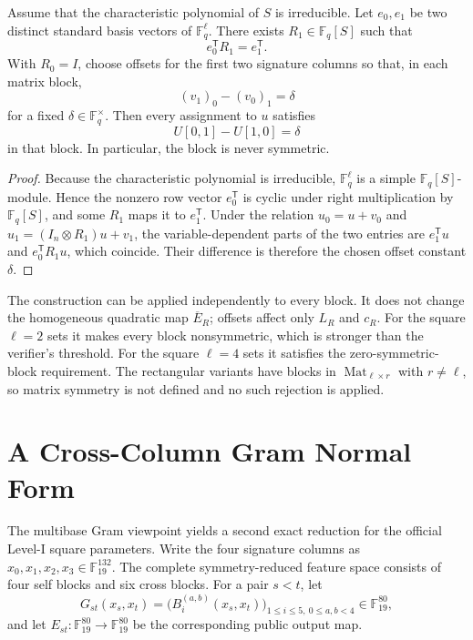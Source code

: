 \documentclass[runningheads]{llncs}
\newcommand{\F}{\mathbb F}
\newcommand{\Mat}{\operatorname{Mat}}
\newcommand{\transpose}{\mathsf T}
\begin{document}
\begin{lemma}\label{lem:skew}
Assume that the characteristic polynomial of $S$ is irreducible.  Let $e_0,e_1$ be two distinct standard basis vectors of $\F_q^\ell$.  There exists $R_1\in\F_q[S]$ such that
\[
 e_0^\transpose R_1=e_1^\transpose.
\]
With $R_0=I$, choose offsets for the first two signature columns so that, in each matrix block,
\[
 (v_1)_0-(v_0)_1=\delta
\]
for a fixed $\delta\in\F_q^\times$.  Then every assignment to $u$ satisfies
\[
 U[0,1]-U[1,0]=\delta
\]
in that block.  In particular, the block is never symmetric.
\end{lemma}

\begin{proof}
Because the characteristic polynomial is irreducible, $\F_q^\ell$ is a simple $\F_q[S]$-module.  Hence the nonzero row vector $e_0^\transpose$ is cyclic under right multiplication by $\F_q[S]$, and some $R_1$ maps it to $e_1^\transpose$.  Under the relation $u_0=u+v_0$ and $u_1=(I_n\otimes R_1)u+v_1$, the variable-dependent parts of the two entries are $e_1^\transpose u$ and $e_0^\transpose R_1u$, which coincide.  Their difference is therefore the chosen offset constant $\delta$.
\end{proof}

The construction can be applied independently to every block.  It does not change the homogeneous quadratic map $\overline E_R$; offsets affect only $L_R$ and $c_R$.  For the square $\ell=2$ sets it makes every block nonsymmetric, which is stronger than the verifier's threshold.  For the square $\ell=4$ sets it satisfies the zero-symmetric-block requirement.  The rectangular variants have blocks in $\Mat_{\ell\times r}$ with $r\ne\ell$, so matrix symmetry is not defined and no such rejection is applied.

\section{A Cross-Column Gram Normal Form}\label{sec:crossnormal}

The multibase Gram viewpoint yields a second exact reduction for the official Level-I square parameters.  Write the four signature columns as $x_0,x_1,x_2,x_3\in\F_{19}^{132}$.  The complete symmetry-reduced feature space consists of four self blocks and six cross blocks.  For a pair $s<t$, let
\[
 G_{st}(x_s,x_t)
 =\bigl(B_i^{(a,b)}(x_s,x_t)\bigr)_{1\le i\le5,\ 0\le a,b<4}
 \in\F_{19}^{80},
\]
and let $E_{st}:\F_{19}^{80}\to\F_{19}^{80}$ be the corresponding public output map.
\end{document}
